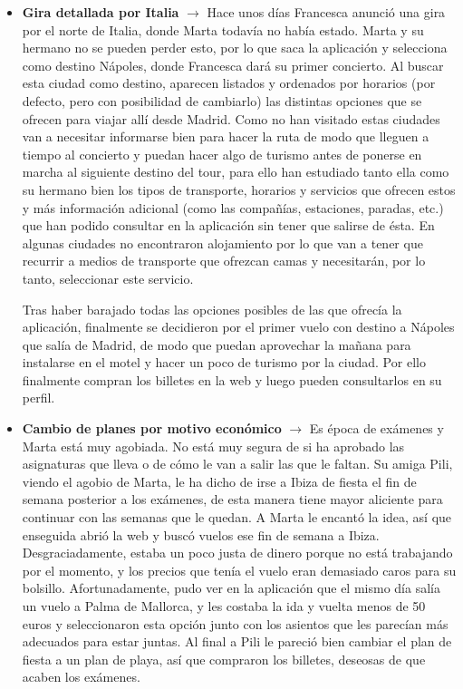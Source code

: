 \begin{itemize}
      \item \textbf{Gira detallada por Italia} $\rightarrow$ Hace unos días Francesca anunció una gira por el norte de Italia, donde Marta todavía no había estado. Marta y su hermano no se pueden perder esto, por lo que saca la aplicación y selecciona como destino Nápoles, donde Francesca dará su primer concierto. Al buscar esta ciudad como destino, aparecen listados y ordenados por horarios (por defecto, pero con posibilidad de cambiarlo) las distintas opciones que se ofrecen para viajar allí desde Madrid. Como no han visitado estas ciudades van a necesitar informarse bien para hacer la ruta de modo que lleguen a tiempo al concierto y puedan hacer algo de turismo antes de ponerse en marcha al siguiente destino del tour, para ello han estudiado tanto ella como su hermano bien los tipos de transporte, horarios y servicios que ofrecen estos y más información adicional (como las compañías, estaciones, paradas, etc.) que han podido consultar en la aplicación sin tener que salirse de ésta. En algunas ciudades no encontraron alojamiento por lo que van a tener que recurrir a medios de transporte que ofrezcan camas y necesitarán, por lo tanto, seleccionar este servicio.

            Tras haber barajado todas las opciones posibles de las que ofrecía la
            aplicación, finalmente se decidieron por el primer vuelo con destino a Nápoles
            que salía de Madrid, de modo que puedan aprovechar la mañana para instalarse
            en el motel y hacer un poco de turismo por la ciudad. Por ello finalmente
            compran los billetes en la web y luego pueden consultarlos en su perfil.

      \item \textbf{Cambio de planes por motivo económico} $\rightarrow$ Es época de exámenes y Marta está muy agobiada. No está muy segura de si ha aprobado las asignaturas que lleva o de cómo le van a salir las que le faltan. Su amiga Pili, viendo el agobio de Marta, le ha dicho de irse a Ibiza de fiesta el fin de semana posterior a los exámenes, de esta manera tiene mayor aliciente para continuar con las semanas que le quedan. A Marta le encantó la idea, así que enseguida abrió la web y buscó vuelos ese fin de semana a Ibiza. Desgraciadamente, estaba un poco justa de dinero porque no está trabajando por el momento, y los precios que tenía el vuelo eran demasiado caros para su bolsillo. Afortunadamente, pudo ver en la aplicación que el mismo día salía un vuelo a Palma de Mallorca, y les costaba la ida y vuelta menos de 50 euros y seleccionaron esta opción junto con los asientos que les parecían más adecuados para estar juntas. Al final a Pili le pareció bien cambiar el plan de fiesta a un plan de playa, así que compraron los billetes, deseosas de que acaben los exámenes.
\end{itemize}
